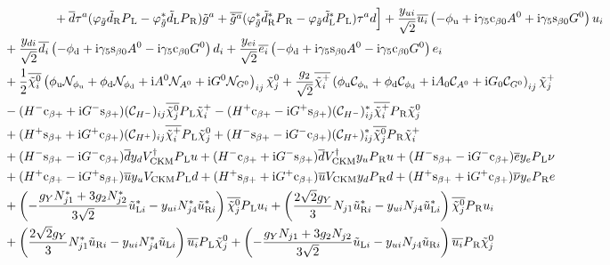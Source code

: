 \documentclass[CheatSheet]{subfiles}
\begin{document}
\begin{align}
\notag\\&\qquad\qquad
 + \overline{d}\tau^a(\varphi_{\tilde g}\tdR\PL-\varphi^*_{\tilde g}\tdL\PR) \tig^a
 + \overline{\tig^a}(\varphi^*_{\tilde g} \tdR^{*}\PR -\varphi_{\tilde g}\tdL^{*}\PL) \tau^{a}d
\Bigr]
+\frac{\yu[i]}{\sqrt2}\overline{u_i}\left(- {\phi\w u}+\ii\gamma_5\co{\beta0}A^0 + \ii\gamma_5\si{\beta0}G^0\right) u_i
\notag\\&
+\frac{\yd[i]}{\sqrt2}\overline{d_i}\left(- {\phi\w d}+\ii\gamma_5\si{\beta0}A^0 - \ii\gamma_5\co{\beta0}G^0\right) d_i
+\frac{\ye[i]}{\sqrt2}\overline{e_i}\left(- {\phi\w d}+\ii\gamma_5\si{\beta0}A^0 - \ii\gamma_5\co{\beta0}G^0\right) e_i
\notag\\&
+ \frac12\overline{\neut[i]}\left(
    \phi\w u \mathcal N_{\phi\w u}  + \phi\w d \mathcal N_{\phi\w d}  + \ii A^0 \mathcal N_{A^0}  + \ii G^0\mathcal N_{G^0}
  \right)_{ij}\neut[j]
+\frac{g_2}{\sqrt2}\overline{\charP[i]}\left(
      \phi\w u \mathcal C_{\phi\w u}  + \phi\w d \mathcal C_{\phi\w d}
    + \ii A_0 \mathcal C_{A^0}  + \ii G_0\mathcal C_{G^0}
\right)_{ij}\charP[j]
\notag\\&
  - (H^-\co{\beta+}+\ii G^-\si{\beta+}) (\mathcal C_{H^-})_{ij} \overline{\neut[j]}\PL \charP[i]
  - (H^+\co{\beta+}-\ii G^+\si{\beta+}) (\mathcal C_{H^-})_{ij}^*  \overline{\charP[i]}\PR\neut[j]
\notag\\&
  + (H^+\si{\beta+}+\ii G^+\co{\beta+}) (\mathcal C_{H^+})_{ij} \overline{\charP[i]}\PL\neut[j]
  + (H^-\si{\beta+}-\ii G^-\co{\beta+}) (\mathcal C_{H^+})_{ij}^* \overline{\neut[j]}\PR \charP[i]
\notag\\&
  + (H^-\si{\beta+}-\ii G^-\co{\beta+}) \overline{d}\yd V\w{CKM}^\dagger\PL u
  + (H^-\co{\beta+}+\ii G^-\si{\beta+}) \overline{d}V\w{CKM}^\dagger\yu \PR u
  + (H^-\si{\beta+}-\ii G^-\co{\beta+}) \overline{e}\ye\PL\nu
\notag\\&
  + (H^+\co{\beta+}-\ii G^+\si{\beta+}) \overline{u}\yu V\w{CKM} \PL d
  + (H^+\si{\beta+}+\ii G^+\co{\beta+}) \overline{u}V\w{CKM}\yd \PR d
  + (H^+\si{\beta+}+\ii G^+\co{\beta+}) \overline{\nu}\ye\PR e
\notag\\&+ \left(-\frac{g_Y N_{j1}^*+3g_2 N_{j2}^*}{3\sqrt{2}}\tuL[i]^{*}-\yu[i]N_{j4}^*\tuR[i]^{*}\right){\overline{\neut[j]}\PL u_i}
   + \left(\frac{2\sqrt2g_Y}{3} N_{j1} \tuR[i]^*-\yu[i]N_{j4}\tuL[i]^* \right){\overline{\neut[j]}\PR u_i}
\notag\\&+ \left(\frac{2\sqrt2g_Y}{3} N_{j1}^* \tuR[i]-\yu[i]N_{j4}^*\tuL[i] \right){\overline{u_i}\PL \neut[j]}
   +  \left(-\frac{g_Y N_{j1}+3g_2 N_{j2}}{3\sqrt{2}}\tuL[i]-\yu[i]N_{j4}\tuR[i]\right){\overline{u_i}\PR \neut[j]}

\end{align}
\end{document}
